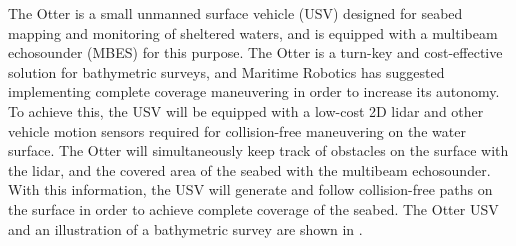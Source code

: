 The Otter is a small unmanned surface vehicle (USV) designed for seabed mapping and monitoring of sheltered waters, and is equipped with a multibeam echosounder (MBES) for this purpose. The Otter is a turn-key and cost-effective solution for bathymetric surveys, and Maritime Robotics has suggested implementing complete coverage maneuvering in order to increase its autonomy. To achieve this, the USV will be equipped with a low-cost 2D lidar and other vehicle motion sensors required for collision-free maneuvering on the water surface. The Otter will simultaneously keep track of obstacles on the surface with the lidar, and the covered area of the seabed with the multibeam echosounder. With this information, the USV will generate and follow collision-free paths on the surface in order to achieve complete coverage of the seabed. The Otter USV and an illustration of a bathymetric survey are shown in .

